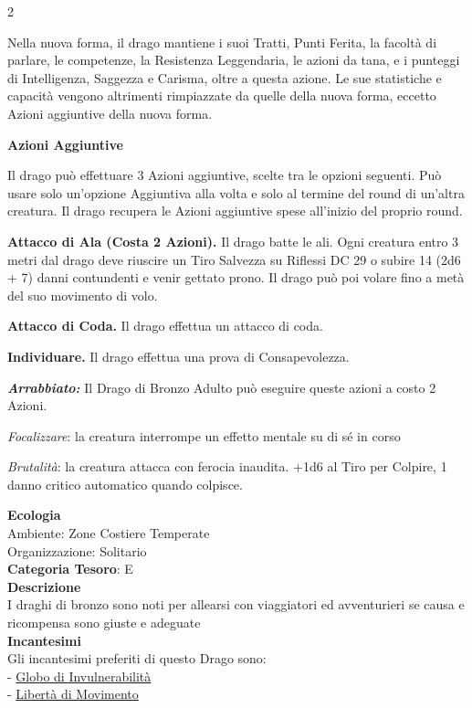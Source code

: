 \begin{multicols}{2}
{Nella nuova forma, il drago mantiene i suoi Tratti, Punti Ferita, la facoltà di parlare, le competenze, la Resistenza Leggendaria, le azioni da tana, e i punteggi di Intelligenza, Saggezza e Carisma, oltre a questa azione. Le sue statistiche e capacità vengono altrimenti rimpiazzate da quelle della nuova forma, eccetto Azioni aggiuntive della nuova forma.

\textbf{Azioni Aggiuntive}

Il drago può effettuare 3 Azioni aggiuntive, scelte tra le opzioni seguenti. Può usare solo un'opzione Aggiuntiva alla volta e solo al termine del round di un'altra creatura. Il drago recupera le Azioni aggiuntive spese all'inizio del proprio round.

\textbf{Attacco di Ala (Costa 2 Azioni).} Il drago batte le ali. Ogni creatura entro 3 metri dal drago deve riuscire un Tiro Salvezza su Riflessi DC 29 o subire 14 (2d6 + 7) danni contundenti e venir gettato prono. Il drago può poi volare fino a metà del suo movimento di volo.

\textbf{Attacco di Coda.} Il drago effettua un attacco di coda.

\textbf{Individuare.} Il drago effettua una prova di Consapevolezza.

\emph{\textbf{Arrabbiato:}} Il Drago di Bronzo Adulto può eseguire queste azioni a costo 2 Azioni.

\emph{Focalizzare}: la creatura interrompe un effetto mentale su di sé in corso

\emph{Brutalità}: la creatura attacca con ferocia inaudita. +1d6 al Tiro per Colpire, 1 danno critico automatico quando colpisce.

\textbf{Ecologia}\\
Ambiente: Zone Costiere Temperate\\
Organizzazione: Solitario\\
\textbf{Categoria Tesoro}: E\\
\textbf{Descrizione}\\
I draghi di bronzo sono noti per allearsi con viaggiatori ed avventurieri se causa e ricompensa sono giuste e adeguate\\
\textbf{Incantesimi}\\
Gli incantesimi preferiti di questo Drago sono:\\
- \hyperlink{Globo di Invulnerabilità}{Globo di Invulnerabilità}\\
- \hyperlink{Libertà di Movimento}{Libertà di Movimento}

}
\end{multicols}
